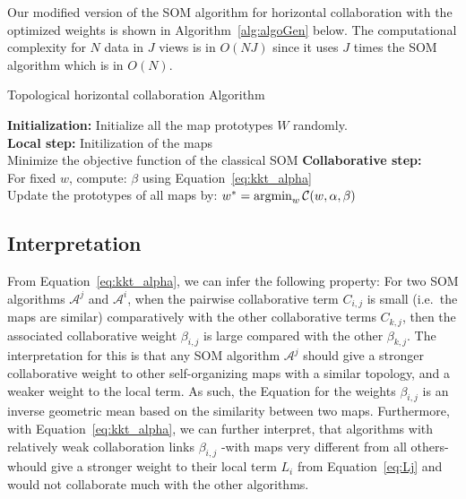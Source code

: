 \medskip
Our modified version of the SOM algorithm for horizontal collaboration with the optimized weights is shown in Algorithm~\ref{alg:algoGen} below. The computational complexity for $N$ data in $J$ views is in $O(NJ)$ since it uses $J$ times the SOM algorithm which is in $O(N)$.

\begin{algorithm}[!h]
\label{alg:algoGen}
\SetAlgoLined{}
	\vspace{0.05cm}
	\caption{Topological horizontal collaboration Algorithm}
	\vspace{0.05cm}
	\textbf{Initialization:} Initialize all the map prototypes $W$ randomly. \\
	\textbf{Local step:} Initilization of the maps\\
	 {
		Minimize the objective function of the classical SOM
	} 
	\textbf{Collaborative step:}\\
	 {
		For fixed $w$, compute:
		$\beta$ using Equation~\eqref{eq:kkt_alpha} \\	 
		Update the prototypes of all maps by: 
		$ 
		w^{*} =  \operatornamewithlimits{argmin}_{w}\mathcal{C}(w,\alpha,\beta) 
		$
	}	 
\end{algorithm}

\subsection{Interpretation}
\label{sec:interpretation}

From Equation~\eqref{eq:kkt_alpha}, we can infer the following property: For two SOM algorithms $\mathcal{A}^j$ and $\mathcal{A}^i$, when the pairwise collaborative term $C_{i,j}$ is small (i.e.\ the maps are similar) comparatively with the other collaborative terms $C_{k,j}$, then the associated collaborative weight $\beta_{i,j}$ is large compared with the other $\beta_{k,j}$. The interpretation for this is that any SOM algorithm $\mathcal{A}^j$ should give a stronger collaborative weight to other self-organizing maps with a similar topology, and a weaker weight to the local term. As such, the Equation for the weights $\beta_{i,j}$ is an inverse geometric mean based on the similarity between two maps. 
Furthermore, with Equation~\eqref{eq:kkt_alpha}, we can further interpret, that algorithms with relatively weak collaboration links $\beta_{i,j}$ -with maps very different from all others- whould give a stronger weight to their local term $L_i$ from Equation~\eqref{eq:Lj} and would not collaborate much with the other algorithms. 

